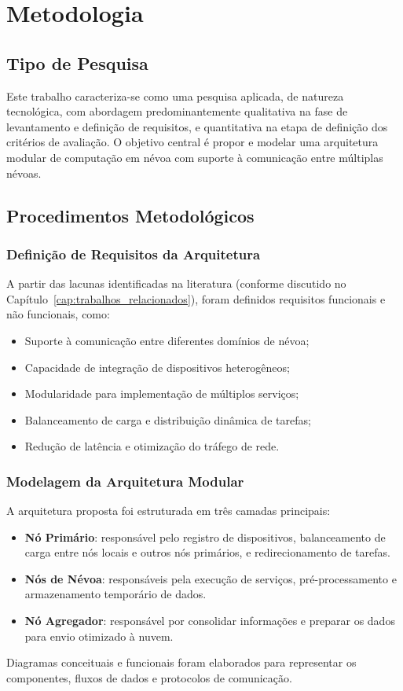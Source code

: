 \chapter{Metodologia}

\section{Tipo de Pesquisa}
Este trabalho caracteriza-se como uma pesquisa aplicada, de natureza tecnológica, com abordagem predominantemente qualitativa na fase de levantamento e definição de requisitos, e quantitativa na etapa de definição dos critérios de avaliação. O objetivo central é propor e modelar uma arquitetura modular de computação em névoa com suporte à comunicação entre múltiplas névoas.

\section{Procedimentos Metodológicos}

\subsection{Definição de Requisitos da Arquitetura}
A partir das lacunas identificadas na literatura (conforme discutido no Capítulo~\ref{cap:trabalhos_relacionados}), foram definidos requisitos funcionais e não funcionais, como:
\begin{itemize}
    \item Suporte à comunicação entre diferentes domínios de névoa;
    \item Capacidade de integração de dispositivos heterogêneos;
    \item Modularidade para implementação de múltiplos serviços;
    \item Balanceamento de carga e distribuição dinâmica de tarefas;
    \item Redução de latência e otimização do tráfego de rede.
\end{itemize}

\subsection{Modelagem da Arquitetura Modular}
A arquitetura proposta foi estruturada em três camadas principais:
\begin{itemize}
    \item \textbf{Nó Primário}: responsável pelo registro de dispositivos, balanceamento de carga entre nós locais e outros nós primários, e redirecionamento de tarefas.
    \item \textbf{Nós de Névoa}: responsáveis pela execução de serviços, pré-processamento e armazenamento temporário de dados.
    \item \textbf{Nó Agregador}: responsável por consolidar informações e preparar os dados para envio otimizado à nuvem.
\end{itemize}
Diagramas conceituais e funcionais foram elaborados para representar os componentes, fluxos de dados e protocolos de comunicação.

